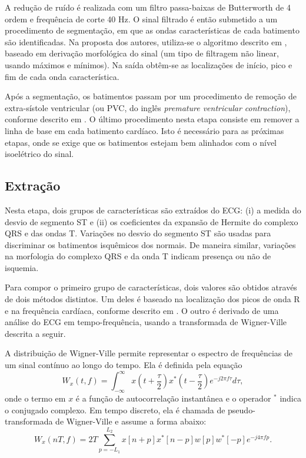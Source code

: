 A redução de ruído é realizada com um filtro passa-baixas de Butterworth de 4\textordfeminine{} ordem e frequência de corte 40 Hz. O sinal filtrado é então submetido a um procedimento de segmentação, em que as ondas características de cada batimento são identificadas. Na proposta dos autores, utiliza-se o algoritmo descrito em \cite{Sun2005}, baseado em derivação morfológica do sinal (um tipo de filtragem não linear, usando máximos e mínimos). Na saída obtêm-se as localizações de início, pico e fim de cada onda característica.

Após a segmentação, os batimentos passam por um procedimento de remoção de extra-sístole ventricular (ou PVC, do inglês \emph{premature ventricular contraction}), conforme descrito em \cite{Couceiro2008}. O último procedimento nesta etapa consiste em remover a linha de base em cada batimento cardíaco. Isto é necessário para as próximas etapas, onde se exige que os batimentos estejam bem alinhados com o nível isoelétrico do sinal.

\subsection*{Extração}
Nesta etapa, dois grupos de características são extraídos do ECG: (i) a medida do desvio de segmento ST e (ii) os coeficientes da expansão de Hermite do complexo QRS e das ondas T. Variações no desvio do segmento ST são usadas para discriminar os batimentos isquêmicos dos normais. De maneira similar, variações na morfologia do complexo QRS e da onda T indicam presença ou não de isquemia.

Para compor o primeiro grupo de características, dois valores são obtidos através de dois métodos distintos. Um deles é baseado na localização dos picos de onda R e na frequência cardíaca, conforme descrito em \cite{Pang2005}. O outro é derivado de uma análise do ECG em tempo-frequência, usando a transformada de Wigner-Ville descrita a seguir.

A distribuição de Wigner-Ville permite representar o espectro de frequências de um sinal contínuo ao longo do tempo. Ela é definida pela equação
\begin{equation}
    W_x(t,f) = \int_{-\infty}^{\infty} x\left( t+\frac{\tau}{2} \right) x^*\left( t-\frac{\tau}{2} \right) e^{-j2\pi f \tau} d\tau,
\end{equation}
onde o termo em $x$ é a função de autocorrelação instantânea e o operador $^*$ indica o conjugado complexo. Em tempo discreto, ela é chamada de pseudo-transformada de Wigner-Ville e assume a forma abaixo:
\begin{equation}
    W_x(nT,f) = 2T\sum_{p=-L_1}^{L_2} x[n+p]x^*[n-p]w[p]w^*[-p]e^{-j4\pi fp}.
    \label{equ:wigner}
\end{equation}

